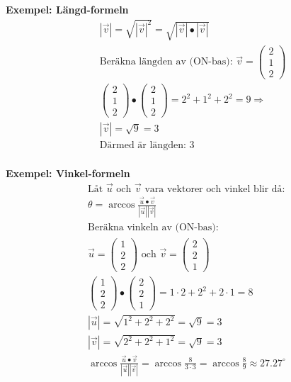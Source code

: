 \begin{multicols}{2}
\textbf{Exempel: Längd-formeln}
\begin{align*}
  &\quad  |\vec{v}| = \sqrt{|\vec{v}|^2} = \sqrt{|\vec{v}|\bullet|\vec{v}|}  \\
  &\quad  \text{Beräkna längden av (ON-bas): } 
  \vec{v} = \begin{pmatrix} 2 \\ 1 \\ 2 \end{pmatrix} \\
  &\quad
  \begin{pmatrix} 2 \\ 1 \\ 2 \end{pmatrix} \bullet \begin{pmatrix} 2 \\ 1 \\ 2 \end{pmatrix} =
  2^2 + 1^2 + 2^2 = 9 \Rightarrow \\
  &\quad  |\vec{v}| = \sqrt{9} = 3 \\
  &\quad  \text{Därmed är längden: } 3 \\
\end{align*}


\textbf{Exempel: Vinkel-formeln}
\begin{align*}
  &\text{Låt $\vec{u}$ och $\vec{v}$ vara vektorer och vinkel blir då: } \\
  &\theta = \arccos{\frac{\vec{u}\bullet\vec{v}}{|\vec{u}||\vec{v}|}} \\
  &\text{Beräkna vinkeln av (ON-bas): }  \\
  &\vec{u} = \begin{pmatrix} 1 \\ 2 \\ 2 \end{pmatrix} 
  \text{ och }
  \vec{v} = \begin{pmatrix} 2 \\ 2 \\ 1 \end{pmatrix} \\
  &\begin{pmatrix} 1 \\ 2 \\ 2 \end{pmatrix} \bullet \begin{pmatrix} 2 \\ 2 \\ 1 \end{pmatrix} =
  1\cdot{2} + 2^2 + 2\cdot{1} = 8 \\
  &|\vec{u}| = \sqrt{1^2+2^2+2^2}=\sqrt{9}=3 \\
  &|\vec{v}| = \sqrt{2^2+2^2+1^2}=\sqrt{9}=3 \\
  &\arccos{\frac{\vec{u}\bullet\vec{v}}{|\vec{u}||\vec{v}|}} =
  \arccos{\frac{8}{3\cdot{3}}} = \arccos{\frac{8}{9}} \approx 27.27^\circ
\end{align*}



\end{multicols}
